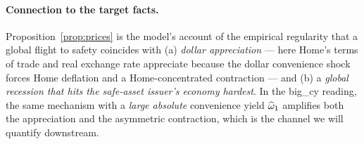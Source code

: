 \paragraph{Connection to the target facts.} Proposition~\ref{prop:prices} is the
model's account of the empirical regularity that a global flight to safety
coincides with (a) \emph{dollar appreciation} --- here Home's terms of trade and
real exchange rate appreciate because the dollar convenience shock forces Home
deflation and a Home-concentrated contraction --- and (b) a \emph{global
recession that hits the safe-asset issuer's economy hardest}. In the big\_cy
reading, the same mechanism with a \emph{large absolute} convenience yield
$\widehat{\omega}_1$ amplifies both the appreciation and the asymmetric contraction,
which is the channel we will quantify downstream.
